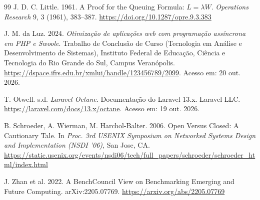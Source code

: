 \begin{thebibliography}{99}
J. D. C. Little. 1961. A Proof for the Queuing Formula: $L=\lambda W$. \textit{Operations Research} 9, 3 (1961), 383--387. \url{https://doi.org/10.1287/opre.9.3.383}

J. M. da Luz. 2024. \textit{Otimização de aplicações web com programação assíncrona em PHP e Swoole}. Trabalho de Conclusão de Curso (Tecnologia em Análise e Desenvolvimento de Sistemas), Instituto Federal de Educação, Ciência e Tecnologia do Rio Grande do Sul, Campus Veranópolis. \url{https://dspace.ifrs.edu.br/xmlui/handle/123456789/2099}. Acesso em: 20 out. 2026.

T. Otwell. s.d. \textit{Laravel Octane}. Documentação do Laravel 13.x. Laravel LLC. \url{https://laravel.com/docs/13.x/octane}. Acesso em: 19 out. 2026.

B. Schroeder, A. Wierman, M. Harchol-Balter. 2006. Open Versus Closed: A Cautionary Tale. In \textit{Proc. 3rd USENIX Symposium on Networked Systems Design and Implementation (NSDI '06)}, San Jose, CA. \url{https://static.usenix.org/events/nsdi06/tech/full_papers/schroeder/schroeder_html/index.html}

J. Zhan et al. 2022. A BenchCouncil View on Benchmarking Emerging and Future Computing. arXiv:2205.07769. \url{https://arxiv.org/abs/2205.07769}

\end{thebibliography}
